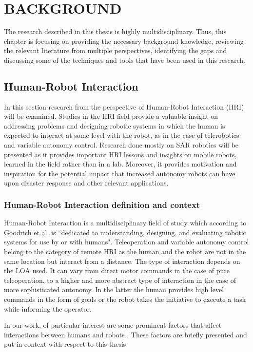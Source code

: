 \documentclass[a4paper,12pt,oneside,openright]{bhamthesis}
\begin{document}
\chapter{BACKGROUND}\label{chapter:background}

The research described in this thesis is highly multidisciplinary. Thus, this chapter is focusing on providing the necessary background knowledge, reviewing the relevant literature from multiple perspectives, identifying the gaps and discussing some of the techniques and tools that have been used in this research.


\section{Human-Robot Interaction}
In this section research from the perspective of Human-Robot Interaction (HRI) will be examined. Studies in the HRI field provide a valuable insight on addressing problems and designing robotic systems in which the human is expected to interact at some level with the robot, as in the case of telerobotics and variable autonomy control. Research done mostly on SAR robotics will be presented as it provides important HRI lessons and insights on mobile robots, learned in the field rather than in a lab. Moreover, it provides motivation and inspiration for the potential impact that increased autonomy robots can have upon disaster response and other relevant applications.

\subsection{Human-Robot Interaction definition and context}
Human-Robot Interaction is a multidisciplinary field of study which according to Goodrich et al. \citep{Goodrich2007a} is ``dedicated to understanding, designing, and evaluating robotic systems for use by or with humans". Teleoperation and variable autonomy control belong to the category of remote HRI as the human and the robot are not in the same location but interact from a distance. The type of interaction depends on the LOA used. It can vary from direct motor commands in the case of pure teleoperation, to a higher and more abstract type of interaction in the case of more sophisticated autonomy. In the latter the human provides high level commands in the form of goals or the robot takes the initiative to execute a task while informing the operator.

In our work, of particular interest are some prominent factors that affect interactions between humans and robots \citep{Goodrich2007a}. These factors are briefly presented and put in context with respect to this thesis:
\end{document}
